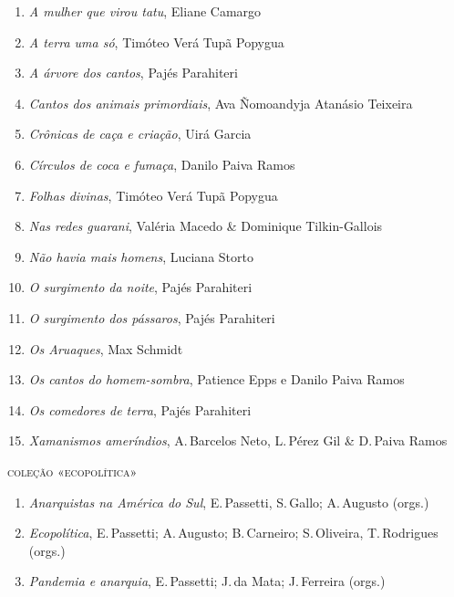 \begin{enumerate}
\setlength\parskip{4.2pt}
\setlength\itemsep{-1.4mm}
\item \textit{A mulher que virou tatu}, Eliane Camargo
\item \textit{A terra uma só}, Timóteo Verá Tupã Popygua
\item \textit{A árvore dos cantos}, Pajés Parahiteri
\item \textit{Cantos dos animais primordiais}, Ava Ñomoandyja Atanásio Teixeira
\item \textit{Crônicas de caça e criação}, Uirá Garcia
\item \textit{Círculos de coca e fumaça}, Danilo Paiva Ramos
\item \textit{Folhas divinas}, Timóteo Verá Tupã Popygua
\item \textit{Nas redes guarani}, Valéria Macedo \& Dominique Tilkin-Gallois
\item \textit{Não havia mais homens}, Luciana Storto
\item \textit{O surgimento da noite}, Pajés Parahiteri
\item \textit{O surgimento dos pássaros}, Pajés Parahiteri
\item \textit{Os Aruaques}, Max Schmidt
\item \textit{Os cantos do homem-sombra}, Patience Epps e Danilo Paiva Ramos
\item \textit{Os comedores de terra}, Pajés Parahiteri
\item \textit{Xamanismos ameríndios}, A.\,Barcelos Neto, L.\,Pérez Gil \& D.\,Paiva Ramos
\end{enumerate}

\medskip
{\large\textsc{coleção «ecopolítica»}}

\begin{enumerate}
\setlength\parskip{4.2pt}
\setlength\itemsep{-1.4mm}
\item \textit{Anarquistas na América do Sul}, E.\,Passetti, S.\,Gallo; A.\,Augusto  (orgs.)
\item \textit{Ecopolítica}, E.\,Passetti; A.\,Augusto; B.\,Carneiro; S.\,Oliveira, T.\,Rodrigues  (orgs.)
\item \textit{Pandemia e anarquia}, E.\,Passetti; J.\,da Mata; J.\,Ferreira  (orgs.)
\end{enumerate}


